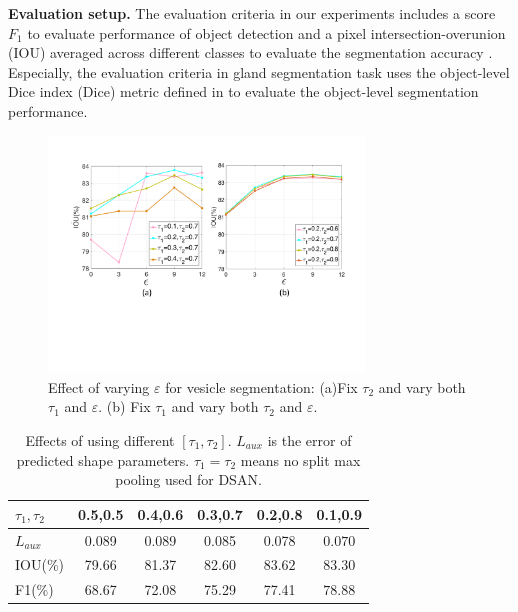 \noindent\textbf{Evaluation setup.}
%
The evaluation criteria in our experiments includes a score $F_1$ \cite{Chen2016a} to evaluate performance of object detection and a pixel intersection-overunion (IOU) averaged across different classes \cite{Chen2014a} to evaluate  the segmentation accuracy .
Especially, the evaluation criteria in gland segmentation task uses the object-level Dice index (Dice) metric defined in \cite{Chen2016a} to evaluate the object-level segmentation performance.
\begin{figure}
    \begin{center}
        \includegraphics[width=3.3in]{figures/FigVar.pdf}
    \end{center}
    \caption{Effect of varying $\varepsilon$ for vesicle segmentation: (a)Fix $\tau_2$ and vary both $\tau_1$ and $\varepsilon$. (b) Fix $\tau_1$ and vary both $\tau_2$ and $\varepsilon$.}
    \label{FigVar}
\end{figure}

\begin{table}
\begin{center}
\begin{tabular}{l|ccccc}
\hline
$\tau_1,\tau_2$ & 0.5,0.5 & 0.4,0.6&0.3,0.7&0.2,0.8&0.1,0.9\\
\hline
$L_{aux}$&0.089&0.089&0.085&0.078&$\mathbf{0.070}$\\
\hline
IOU(\%)&79.66& 81.37&82.60&$\mathbf{83.62}$&83.30\\
\hline
F1(\%)&68.67&72.08&75.29&77.41&$\mathbf{78.88}$\\
\hline
\end{tabular}
\end{center}
\caption{Effects of using different $[\tau_1,\tau_2]$.
        $L_{aux}$ is the error of predicted shape parameters.
        $\tau_1=\tau_2$ means no split max pooling used for DSAN.}
\label{tab:var}
\end{table}

